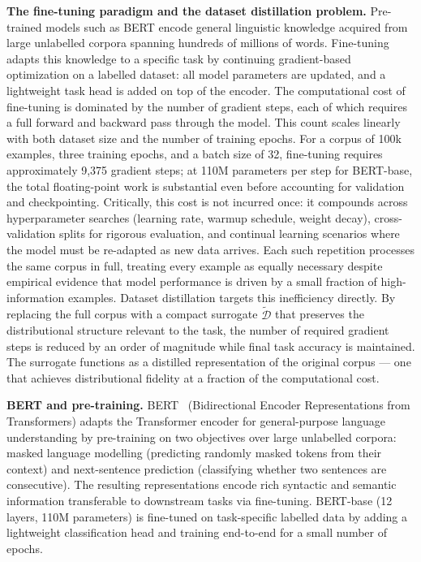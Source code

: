 \begin{foldable}
  \textbf{The fine-tuning paradigm and the dataset distillation problem.}
  Pre-trained models such as BERT encode general linguistic knowledge acquired from large unlabelled corpora spanning hundreds of millions of words.
  Fine-tuning adapts this knowledge to a specific task by continuing gradient-based optimization on a labelled dataset: all model parameters are updated, and a lightweight task head is added on top of the encoder.
  The computational cost of fine-tuning is dominated by the number of gradient steps, each of which requires a full forward and backward pass through the model.
  This count scales linearly with both dataset size and the number of training epochs.
  For a corpus of 100k examples, three training epochs, and a batch size of 32, fine-tuning requires approximately 9,375 gradient steps; at 110M parameters per step for BERT-base, the total floating-point work is substantial even before accounting for validation and checkpointing.
  Critically, this cost is not incurred once: it compounds across hyperparameter searches (learning rate, warmup schedule, weight decay), cross-validation splits for rigorous evaluation, and continual learning scenarios where the model must be re-adapted as new data arrives.
  Each such repetition processes the same corpus in full, treating every example as equally necessary despite empirical evidence that model performance is driven by a small fraction of high-information examples.
  Dataset distillation targets this inefficiency directly.
  By replacing the full corpus with a compact surrogate $\tilde{\mathcal{D}}$ that preserves the distributional structure relevant to the task, the number of required gradient steps is reduced by an order of magnitude while final task accuracy is maintained.
  The surrogate functions as a distilled representation of the original corpus --- one that achieves distributional fidelity at a fraction of the computational cost.
\end{foldable}

\begin{foldable}
  \textbf{BERT and pre-training.}
  BERT~\cite{devlin2019bert} (Bidirectional Encoder Representations from Transformers) adapts the Transformer encoder for general-purpose language understanding by pre-training on two objectives over large unlabelled corpora: masked language modelling (predicting randomly masked tokens from their context) and next-sentence prediction (classifying whether two sentences are consecutive).
  The resulting representations encode rich syntactic and semantic information transferable to downstream tasks via fine-tuning.
  BERT-base (12 layers, 110M parameters) is fine-tuned on task-specific labelled data by adding a lightweight classification head and training end-to-end for a small number of epochs.
\end{foldable}

